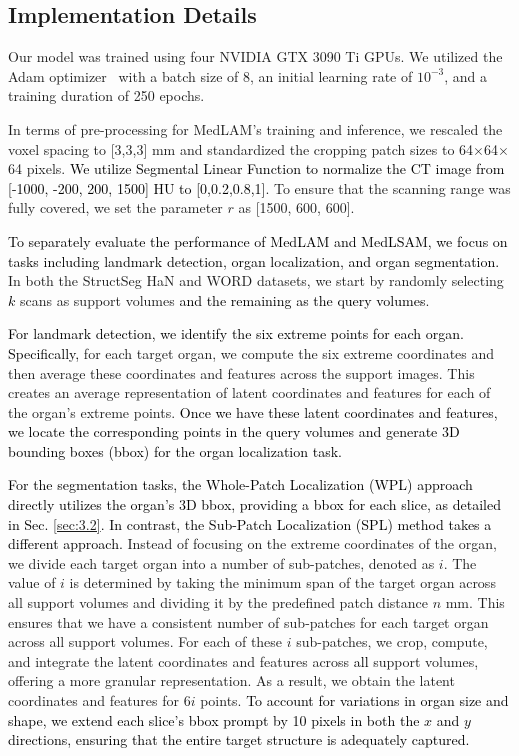 \documentclass[times,twocolumn,final]{elsarticle}
\begin{document}
\subsection{Implementation Details}
\label{sec:4.2}
Our model was trained using four NVIDIA GTX 3090 Ti GPUs. We utilized the Adam optimizer~\cite{kingma2014adam} with a batch size of 8, an initial learning rate of $10^{-3}$, and a training duration of 250 epochs. 
\par In terms of pre-processing for MedLAM's training and inference, we rescaled the voxel spacing to [3,3,3] mm and standardized the cropping patch sizes to 64$\times$64$\times$64 pixels. \textcolor{black}{We utilize Segmental Linear Function\cite{lei2021automatic} to normalize the CT image from [-1000, -200, 200, 1500] HU to [0,0.2,0.8,1]}. To ensure that the scanning range was fully covered, we set the parameter $r$ as [1500, 600, 600]. 
\par \textcolor{black}{To separately evaluate the performance of MedLAM and MedLSAM, we focus on tasks including landmark detection, organ localization, and organ segmentation. }  In both the StructSeg HaN and WORD datasets, we start by randomly selecting \textcolor{black}{$k$} scans as support volumes \textcolor{black}{and the remaining as the query volumes}. 
\par \textcolor{black}{For landmark detection, we identify the six extreme points for each organ. Specifically,}  for each target organ, we compute the six extreme coordinates and then average these coordinates and features across the support images. This creates an average representation of latent coordinates and features for each of the organ's extreme points. \textcolor{black}{Once we have these latent coordinates and features, we locate the corresponding points in the query volumes and generate 3D bounding boxes (bbox) for the organ localization task.}
\par \textcolor{black}{For the segmentation tasks, the Whole-Patch Localization (WPL) approach directly utilizes the organ’s 3D bbox, providing a bbox for each slice, as detailed in Sec. \ref{sec:3.2}. In contrast, the Sub-Patch Localization (SPL) method takes a different approach.} Instead of focusing on the extreme coordinates of the organ, we divide each target organ into a number of sub-patches, denoted as $i$. The value of $i$ is determined by taking the minimum span of the target organ across all support volumes and dividing it by the predefined patch distance $n$ mm. This ensures that we have a consistent number of sub-patches for each target organ across all support volumes. For each of these $i$ sub-patches, we crop, compute, and integrate the latent coordinates and features across \textcolor{black}{all} support volumes, offering a more granular representation. As a result, we obtain the latent coordinates and features for 6$i$ points. \textcolor{black}{To account for variations in organ size and shape, we extend each slice’s bbox prompt by 10 pixels in both the $x$ and $y$ directions, ensuring that the entire target structure is adequately captured. }
\end{document}
